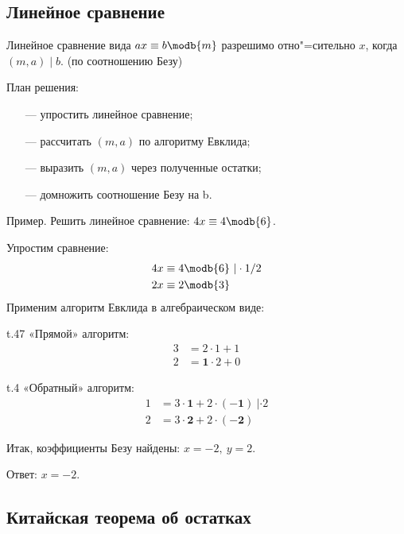\subsection{Линейное сравнение}

{\ital Линейное} сравнение вида $ax\equiv b\modb{m}$ разрешимо отно"=сительно $x$, когда $(m,a)\mid b$. {\ital\color[HTML]{888888} (по соотношению Безу)}

План решения:

\begin{itemize}
\item[---]упростить линейное сравнение;
\item[---]рассчитать $(m,a)$ по алгоритму Евклида;
\item[---]выразить $(m,a)$ через полученные остатки;
\item[---]домножить соотношение Безу на {\ital b}.  
\end{itemize}

{\bold Пример.} Решить линейное сравнение: $4x\equiv 4\modb{6}$.\par
Упростим сравнение:
\begin{align*}
4x&\equiv 4\modb{6}\ |\cdot 1/2\\
2x&\equiv 2\modb{3}
\end{align*}
Применим {\ital алгоритм Евклида} в алгебраическом виде:\par
\begin{column*}{t}{.47\linewidth}
{\ital «Прямой» алгоритм:}
\begin{align*}
3&=2\cdot 1+1\\
2&=\symbf{1}\cdot 2+0
\end{align*}
\end{column*}
\begin{column*}{t}{.4\linewidth}
{\ital «Обратный» алгоритм:}
\begin{align*}
1&=3\cdot \symbf{1}+2\cdot (\symbf{-1})\ |\cdot 2\\
2&=3\cdot \symbf{2}+2\cdot (\symbf{-2})
\end{align*}
\end{column*}\par
Итак, коэффициенты Безу найдены: $x=-2,\ y=2$.\par
{\ital Ответ:} $x=-2$.\par

\subsection{Китайская теорема об остатках}

